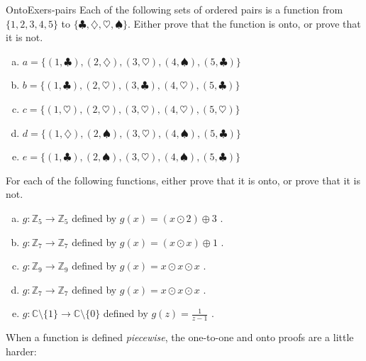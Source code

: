 \begin{exercise}{OntoExers-pairs}
Each of the following sets of ordered pairs is a function from $\{1,2,3,4,5\}$ to $\{\clubsuit,\diamondsuit,\heartsuit,\spadesuit\}$. Either prove that the function is onto, or prove that it is not.
\begin{enumerate}[(a)]
\item \label{OntoExers-pairs-a}
$a = \{ (1,\clubsuit), (2,\diamondsuit), (3,\heartsuit), (4,\spadesuit), (5,\clubsuit) \}$
\item \label{OntoExers-pairs-b}
$b = \{ (1,\clubsuit), (2,\heartsuit), (3,\clubsuit), (4,\heartsuit), (5,\clubsuit) \}$
\item \label{OntoExers-pairs-c}
$c = \{ (1,\heartsuit), (2,\heartsuit), (3, \heartsuit), (4,\heartsuit), (5, \heartsuit) \}$
\item \label{OntoExers-pairs-d}
$d = \{ (1,\diamondsuit), (2,\spadesuit), (3, \heartsuit), (4,\spadesuit), (5, \clubsuit) \}$
\item \label{OntoExers-pairs-e}
$e = \{ (1,\clubsuit), (2,\spadesuit), (3, \heartsuit), (4,\spadesuit), (5, \clubsuit) \}$
\end{enumerate}
\end{exercise}


\begin{exercise}{}
For each of the following  functions, either prove that it is onto, or prove that it is not.
\begin{enumerate}[(a)]
\item \label{modular_m3}
 $g \colon {\mathbb Z}_5 \to {\mathbb Z}_{5}$ defined by $g(x) =  (x \odot 2) \oplus 3$ .
\item 
 $g \colon {\mathbb Z}_7 \to {\mathbb Z}_7$ defined by $g(x)= (x \odot x) \oplus 1 $ .
\item 
 $g \colon {\mathbb Z}_9 \to {\mathbb Z}_9$ defined by $g(x)= x \odot x \odot x$ .
\item 
 $g \colon {\mathbb Z}_7 \to {\mathbb Z}_7$ defined by $g(x)= x \odot x \odot x$ .
\item
 $g \colon {\mathbb C}\setminus \{1\}  \to {\mathbb C}\setminus \{0\} $ defined by $g(z) =  \frac{1}{z-1}$ .
\end{enumerate}
\end{exercise}

When a function is defined \emph{piecewise}, the one-to-one and  onto proofs are a little harder:

